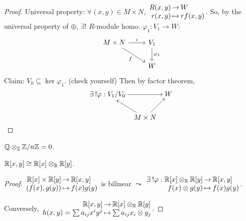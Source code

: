 \begin{theorem}
\begin{proof}
    Universal property: $\forall (x, y) \in M \times N$,
    $\arraycolsep=1pt
    \begin{array}{rcl}
      R(x, y) & \to & W \\
      r(x, y) & \mapsto & rf(x, y)
    \end{array}$. So, by the universal property of $\oplus$,
    $\exists!$ $R$-module homo. $\varphi_1: V_1 \to W$:
    \[
      \begin{tikzcd}
      M\times N \arrow{r}{i} \arrow[swap]{dr}{f}
        & V_1 \arrow{d}{\varphi_1} \\
      & W
      \end{tikzcd}
    \]
    Claim: $V_0 \subseteq \ker \varphi_1$. (check yourself)
    Then by factor theorem,
    \[
      \begin{tikzcd}[cramped, column sep=tiny]
        \exists! \varphi: \quot{V_1}{V_0} \arrow{rr} & & W \\
        & M \times N \arrow{ul} \arrow{ur} &
      \end{tikzcd}
      \qedhere
    \]
  \end{proof}
\end{theorem}

\begin{example}
  $\mathbb{Q} \otimes_{\mathbb{Z}} {\mathbb{Z}}/{n\mathbb{Z}} = 0$.
\end{example}

\begin{example}
  $\mathbb{R}[x, y] \cong \mathbb{R}[x] \otimes_{\mathbb{R}} \mathbb{R}[y]$.
  \begin{proof}
    $\arraycolsep=1pt
    \begin{array}{rcl}
      \Rb[x] \times \Rb[y] & \to & \Rb[x, y] \\
      ( f(x), g(y) ) & \mapsto & f(x)g(y)
    \end{array}$
    is bilinear $\leadsto$
    $\arraycolsep=1pt
    \begin{array}{rcl}
      \exists! \varphi: \Rb[x] \otimes_\Rb \Rb[y] & \to & \Rb[x, y] \\
       f(x) \otimes g(y) & \mapsto & f(x)g(y)
    \end{array}$.

    Conversely, 
    $\arraycolsep=1pt
    \begin{array}{rcl}
      \Rb[x, y] & \to & \Rb[x] \otimes_\Rb \Rb[y] \\
      h(x, y) = \sum a_{ij} x^i y^j & \mapsto & \sum a_{ij} x_i \otimes y_j
    \end{array}$.
  \end{proof}
\end{example}

